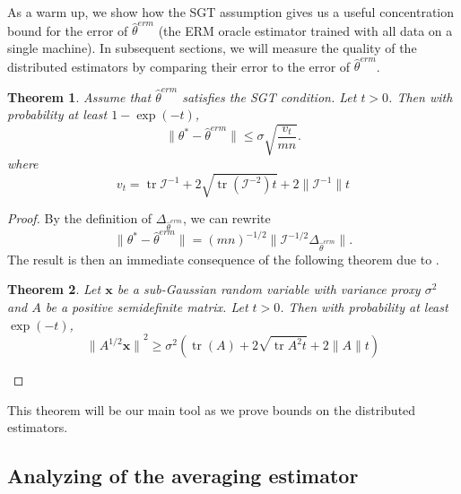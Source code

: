 \documentclass[twoside]{article}
\newtheorem{theorem}{Theorem}
\DeclareMathOperator*{\tr}{tr}
\newcommand{\x}{\mathbf{x}}
\newcommand{\w}{\theta}
\newcommand{\wmle}{\hat\w^{erm}}
\newcommand{\wstar}{{\w^{*}}}
\newcommand{\I}{\mathcal I}
\newcommand{\ltwo}[1]{{\lVert {#1} \rVert}}
\newcommand{\prob}[1]{\Pr\left[{#1}\right]}
\begin{document}
As a warm up, we show how the SGT assumption gives us a useful concentration bound for the error of $\wmle$ (the ERM oracle estimator trained with all data on a single machine). 
In subsequent sections, we will measure the quality of the distributed estimators by comparing their error to the error of $\wmle$.

\begin{theorem}
Assume that $\wmle$ satisfies the SGT condition.
Let $t>0$.
Then with probability at least $1-\exp(-t)$,
\begin{equation}
\ltwo{\wstar-\wmle} \le \sigma\sqrt{\frac{v_t}{mn}}
.
\end{equation}
where
\begin{equation}
v_t =
\tr{\I^{-1}}
+ 2\sqrt{\tr \left({\I^{-2}}\right)t}
+ 2\ltwo{\I^{-1}}t
\label{eq:vt}
\end{equation}
\end{theorem}

\begin{proof}
By the definition of $\Delta_{\wmle}$, we can rewrite 
\begin{equation}
\ltwo{\wstar-\wmle} = (mn)^{-1/2}\ltwo{\I^{-1/2}\Delta_{\wmle}}
.
\end{equation}
The result is then an immediate consequence of the following theorem due to \citet{hsu2012tail}.
\begin{theorem}
\label{theorem:quadform}
Let $\x$ be a sub-Gaussian random variable with variance proxy $\sigma^2$ and $A$ be a positive semidefinite matrix.
Let $t>0$.
Then with probability at least $\exp(-t)$,
\begin{equation}
\ltwo{A^{1/2}\x}^2 \ge \sigma^2\left(\tr(A) + 2\sqrt{\tr{A^2}t} + 2\ltwo{A}t\right)
\end{equation}
\end{theorem}
\end{proof}

This theorem will be our main tool as we prove bounds on the distributed estimators.


\subsection{Analyzing of the averaging estimator}
\end{document}
